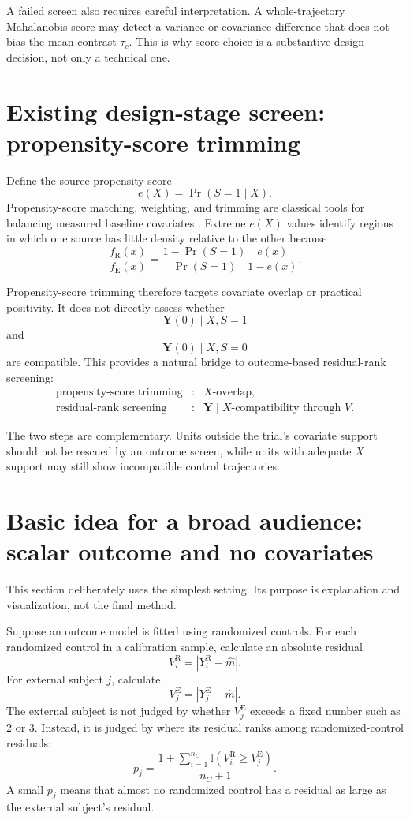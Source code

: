 \documentclass[11pt]{article}
\newcommand{\R}{\mathrm{R}}
\newcommand{\E}{\mathrm{E}}
\newcommand{\ind}{\mathbb{I}}
\begin{document}
A failed screen also requires careful interpretation. A whole-trajectory Mahalanobis score may detect a variance or covariance difference that does not bias the mean contrast $\tau_c$. This is why score choice is a substantive design decision, not only a technical one.

\section{Existing design-stage screen: propensity-score trimming}

Define the source propensity score
\[
e(X)=\Pr(S=1\mid X).
\]
Propensity-score matching, weighting, and trimming are classical tools for balancing measured baseline covariates \citep{rosenbaum1983,crump2009}. Extreme $e(X)$ values identify regions in which one source has little density relative to the other because
\[
\frac{f_{\R}(x)}{f_{\E}(x)}
=
\frac{1-\Pr(S=1)}{\Pr(S=1)}
\frac{e(x)}{1-e(x)}.
\]

Propensity-score trimming therefore targets covariate overlap or practical positivity. It does not directly assess whether
\[
\bm Y(0)\mid X,S=1
\]
and
\[
\bm Y(0)\mid X,S=0
\]
are compatible. This provides a natural bridge to outcome-based residual-rank screening:
\[
\begin{array}{ccl}
\text{propensity-score trimming} &:& X\text{-overlap},\\[0.2em]
\text{residual-rank screening} &:& \bm Y\mid X\text{-compatibility through }V.
\end{array}
\]

The two steps are complementary. Units outside the trial's covariate support should not be rescued by an outcome screen, while units with adequate $X$ support may still show incompatible control trajectories.

\section{Basic idea for a broad audience: scalar outcome and no covariates}

This section deliberately uses the simplest setting. Its purpose is explanation and visualization, not the final method.

Suppose an outcome model is fitted using randomized controls. For each randomized control in a calibration sample, calculate an absolute residual
\[
V_i^{\R}=|Y_i^{\R}-\widehat m|.
\]
For external subject $j$, calculate
\[
V_j^{\E}=|Y_j^{\E}-\widehat m|.
\]
The external subject is not judged by whether $V_j^{\E}$ exceeds a fixed number such as 2 or 3. Instead, it is judged by where its residual ranks among randomized-control residuals:
\[
p_j=
\frac{1+\sum_{i=1}^{n_C}\ind(V_i^{\R}\ge V_j^{\E})}{n_C+1}.
\tag{1}
\]
A small $p_j$ means that almost no randomized control has a residual as large as the external subject's residual.
\end{document}
